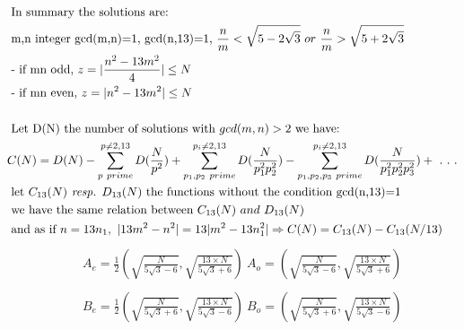 \documentclass[10pt,a4paper]{letter}
\begin{document}
\begin{align*}
	&\text{ In summary the solutions are:} \\
	&\text{ m,n integer gcd(m,n)=1, gcd(n,13)=1, } \frac{n}{m} < \sqrt{5-2\sqrt{3}}\ or \ \frac{n}{m} > \sqrt{5+2\sqrt{3}}\\
	&\text{ - if mn odd, } z=\arrowvert \frac{n^{2}-13m^{2}}{4}\arrowvert \leq N\\
	&\text{ - if mn even, } z=\arrowvert {n^{2}-13m^{2}} \arrowvert \leq N\\
	& \\
	&\text{ Let D(N) the number of solutions with }gcd(m,n) > 2\text{ we have:} \\
	& C(N) = D(N) - \sum_{p\ prime}^{p\neq 2,13}D(\frac{N}{p^{2}})+ \sum_{p_{1},p_{2}\ prime}^{p_{i}\neq 2,13}D(\frac{N}{p_{1}^{2}p_{2}^{2}}) - \sum_{p_{1},p_{2},p_{3}\ prime}^{p_{i}\neq 2,13}D(\frac{N}{p_{1}^{2}p_{2}^{2}p_{3}^{2}})+\ .\ .\ . \\
	&\text{ let }C_{13}(N)\textit{ resp. }D_{13}(N)\text{ the functions without the condition gcd(n,13)=1}\\
	&\text{ we have the same relation between }C_{13}(N)\ and\ D_{13}(N)\\
	&\text{ and as if } n=13n_{1},\ \arrowvert 13m^2-n^{2}\arrowvert =13\arrowvert m^2-13n_{1}^{2}\arrowvert \Rightarrow C(N)=C_{13}(N)-C_{13}(N/13)\\
\end{align*}
\begin{align*}
	&&A_{e}=\frac{1}{2}( \sqrt{\frac{N}{5\sqrt{3}-6}}
       ,\sqrt{\frac{13\times N}{5\sqrt{3}+6}})\ 
       A_{o}=( \sqrt{\frac{N}{5\sqrt{3}-6}}
       ,\sqrt{\frac{13\times N}{5\sqrt{3}+6}}) \\
    && \\
    &&B_{e}=\frac{1}{2}( \sqrt{\frac{N}{5\sqrt{3}+6}}
       ,\sqrt{\frac{13\times N}{5\sqrt{3}-6}})\ 
       B_{o}=( \sqrt{\frac{N}{5\sqrt{3}+6}}
       ,\sqrt{\frac{13\times N}{5\sqrt{3}-6}}) \\     
\end{align*}
\end{document}
